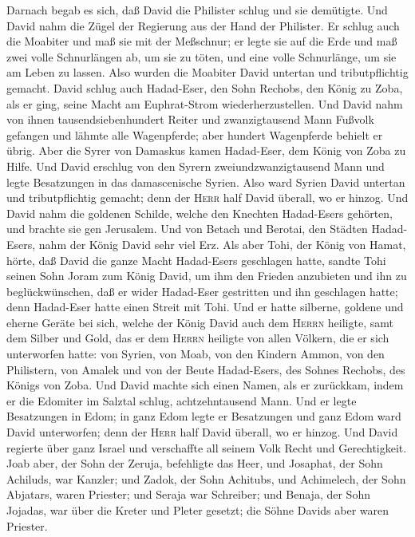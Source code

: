  Darnach begab es sich, daß David die Philister schlug und
sie demütigte. Und David nahm die Zügel der Regierung aus der Hand der
Philister.  Er schlug auch die Moabiter und maß sie mit
der Meßschnur; er legte sie auf die Erde und maß zwei volle Schnurlängen
ab, um sie zu töten, und eine volle Schnurlänge, um sie am Leben zu
lassen. Also wurden die Moabiter David untertan und tributpflichtig
gemacht.  David schlug auch Hadad-Eser, den Sohn Rechobs,
den König zu Zoba, als er ging, seine Macht am Euphrat-Strom
wiederherzustellen.  Und David nahm von ihnen
tausendsiebenhundert Reiter und zwanzigtausend Mann Fußvolk gefangen und
lähmte alle Wagenpferde; aber hundert Wagenpferde behielt er übrig.
 Aber die Syrer von Damaskus kamen Hadad-Eser, dem König
von Zoba zu Hilfe. Und David erschlug von den Syrern
zweiundzwanzigtausend Mann  und legte Besatzungen in das
damascenische Syrien. Also ward Syrien David untertan und
tributpflichtig gemacht; denn der \textsc{Herr} half David überall, wo
er hinzog.  Und David nahm die goldenen Schilde, welche
den Knechten Hadad-Esers gehörten, und brachte sie gen Jerusalem.
 Und von Betach und Berotai, den Städten Hadad-Esers, nahm
der König David sehr viel Erz.  Als aber Tohi, der König
von Hamat, hörte, daß David die ganze Macht Hadad-Esers geschlagen
hatte,  sandte Tohi seinen Sohn Joram zum König David, um
ihm den Frieden anzubieten und ihn zu beglückwünschen, daß er wider
Hadad-Eser gestritten und ihn geschlagen hatte; denn Hadad-Eser hatte
einen Streit mit Tohi. Und er hatte silberne, goldene und eherne Geräte
bei sich,  welche der König David auch dem \textsc{Herrn}
heiligte, samt dem Silber und Gold, das er dem \textsc{Herrn} heiligte
von allen Völkern, die er sich unterworfen hatte:  von
Syrien, von Moab, von den Kindern Ammon, von den Philistern, von Amalek
und von der Beute Hadad-Esers, des Sohnes Rechobs, des Königs von Zoba.
 Und David machte sich einen Namen, als er zurückkam,
indem er die Edomiter im Salztal schlug, achtzehntausend Mann.
 Und er legte Besatzungen in Edom; in ganz Edom legte er
Besatzungen und ganz Edom ward David unterworfen; denn der \textsc{Herr}
half David überall, wo er hinzog.  Und David regierte
über ganz Israel und verschaffte all seinem Volk Recht und
Gerechtigkeit.  Joab aber, der Sohn der Zeruja,
befehligte das Heer, und Josaphat, der Sohn Achiluds, war Kanzler;
 und Zadok, der Sohn Achitubs, und Achimelech, der Sohn
Abjatars, waren Priester; und Seraja war Schreiber;  und
Benaja, der Sohn Jojadas, war über die Kreter und Pleter gesetzt; die
Söhne Davids aber waren Priester.

